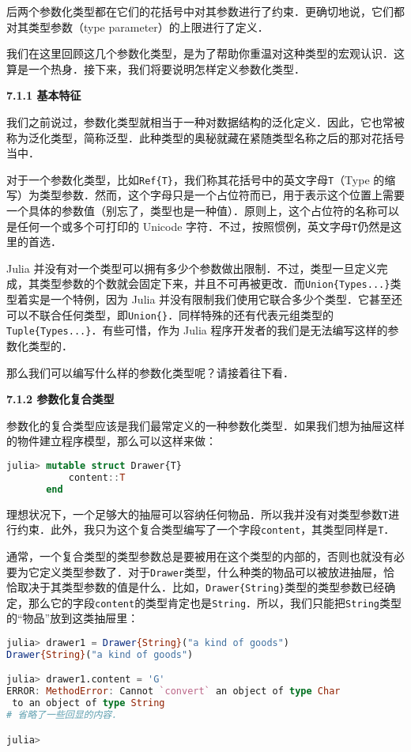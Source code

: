 后两个参数化类型都在它们的花括号中对其参数进行了约束．更确切地说，它们都对其类型参数（type parameter）的上限进行了定义．

我们在这里回顾这几个参数化类型，是为了帮助你重温对这种类型的宏观认识．这算是一个热身．接下来，我们将要说明怎样定义参数化类型．

\textbf{7.1.1 基本特征}

我们之前说过，参数化类型就相当于一种对数据结构的泛化定义．因此，它也常被称为泛化类型，简称泛型．此种类型的奥秘就藏在紧随类型名称之后的那对花括号当中．

对于一个参数化类型，比如\verb|Ref{T}|，我们称其花括号中的英文字母\verb|T|（Type 的缩写）为类型参数．然而，这个字母只是一个占位符而已，用于表示这个位置上需要一个具体的参数值（别忘了，类型也是一种值）．原则上，这个占位符的名称可以是任何一个或多个可打印的 Unicode 字符．不过，按照惯例，英文字母\verb|T|仍然是这里的首选．

Julia 并没有对一个类型可以拥有多少个参数做出限制．不过，类型一旦定义完成，其类型参数的个数就会固定下来，并且不可再被更改．而\verb|Union{Types...}|类型着实是一个特例，因为 Julia 并没有限制我们使用它联合多少个类型．它甚至还可以不联合任何类型，即\verb|Union{}|．同样特殊的还有代表元组类型的\verb|Tuple{Types...}|．有些可惜，作为 Julia 程序开发者的我们是无法编写这样的参数化类型的．

那么我们可以编写什么样的参数化类型呢？请接着往下看．

\textbf{7.1.2 参数化复合类型}

参数化的复合类型应该是我们最常定义的一种参数化类型．如果我们想为抽屉这样的物件建立程序模型，那么可以这样来做：
\begin{lstlisting}[language=julia]
julia> mutable struct Drawer{T}
           content::T
       end 
\end{lstlisting}

理想状况下，一个足够大的抽屉可以容纳任何物品．所以我并没有对类型参数\verb|T|进行约束．此外，我只为这个复合类型编写了一个字段\verb|content|，其类型同样是\verb|T|．

通常，一个复合类型的类型参数总是要被用在这个类型的内部的，否则也就没有必要为它定义类型参数了．对于\verb|Drawer|类型，什么种类的物品可以被放进抽屉，恰恰取决于其类型参数的值是什么．比如，\verb|Drawer{String}|类型的类型参数已经确定，那么它的字段\verb|content|的类型肯定也是\verb|String|．所以，我们只能把\verb|String|类型的“物品”放到这类抽屉里：
\begin{lstlisting}[language=julia]
julia> drawer1 = Drawer{String}("a kind of goods")
Drawer{String}("a kind of goods")

julia> drawer1.content = 'G'
ERROR: MethodError: Cannot `convert` an object of type Char
 to an object of type String
# 省略了一些回显的内容．

julia> 
\end{lstlisting}

